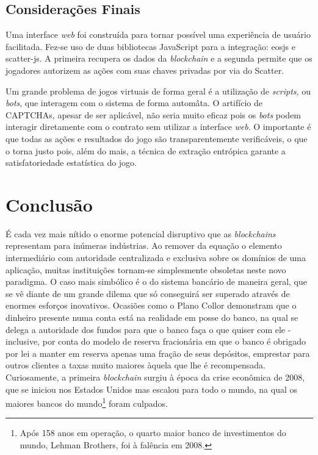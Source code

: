 \documentclass[a4paper,12pt]{monografia}
\theoremstyle{plain}
\theoremstyle{definition}
\theoremstyle{remark}
\begin{document}
\section{Considera\c{c}\~{o}es Finais}

Uma interface \textit{web} foi constru\'ida para tornar poss\'ivel uma experi\^encia de usu\'ario facilitada.
Fez-se uso de duas bibliotecas JavaScript para a integra\c{c}\~ao: eosjs e scatter-js.
A primeira recupera os dados da \textit{blockchain} e a segunda permite que os jogadores autorizem as a\c{c}\~oes com suas chaves privadas por via do Scatter.

Um grande problema de jogos virtuais de forma geral \'e a utiliza\c{c}\~ao de \textit{scripts}, ou \textit{bots}, que interagem com o sistema de forma autom\^ata.
O artif\'icio de CAPTCHAs, apesar de ser aplic\'avel, n\~ao seria muito eficaz pois os \textit{bots} podem interagir diretamente com o contrato sem utilizar a interface \textit{web}.
O importante \'e que todas as a\c{c}\~oes e resultados do jogo s\~ao transparentemente verific\'aveis, o que o torna justo pois, al\'em do mais, a t\'ecnica de extra\c{c}\~ao entr\'opica garante a satisfatoriedade estat\'istica do jogo.

\chapter{Conclus\~{a}o}

\'{E} cada vez mais n\'{i}tido o enorme potencial disruptivo que as \textit{blockchains} representam para in\'{u}meras ind\'{u}strias.
Ao remover da equa\c{c}\~{a}o o elemento intermedi\'{a}rio com autoridade centralizada e exclusiva sobre os dom\'{i}nios de uma aplica\c{c}\~{a}o, muitas institui\c{c}\~{o}es tornam-se simplesmente obsoletas neste novo paradigma.
O caso mais simb\'{o}lico \'{e} o do sistema banc\'{a}rio de maneira geral, que se v\^{e} diante de um grande dilema que s\'{o} conseguir\'{a} ser superado atrav\'{e}s de enormes esfor\c{c}os inovativos.
Ocasi\~oes como o Plano Collor demonstram que o dinheiro presente numa conta est\'a na realidade em posse do banco, na qual se delega a autoridade dos fundos para que o banco fa\c{c}a o que quiser com ele - inclusive, por conta do modelo de reserva fracion\'aria em que o banco \'e obrigado por lei a manter em reserva apenas uma fra\c{c}\~ao de seus dep\'ositos, emprestar para outros clientes a taxas muito maiores \`aquela que lhe \'e recompensada.
Curiosamente, a primeira \textit{blockchain} surgiu \`{a} \'{e}poca da crise econ\^{o}mica de 2008, que se iniciou nos Estados Unidos mas escalou para todo o mundo, na qual os maiores bancos do mundo\footnote{Ap\'os 158 anos em opera\c{c}\~ao, o quarto maior banco de investimentos do mundo, Lehman Brothers, foi \`a fal\^encia em 2008.} foram culpados.
\end{document}
